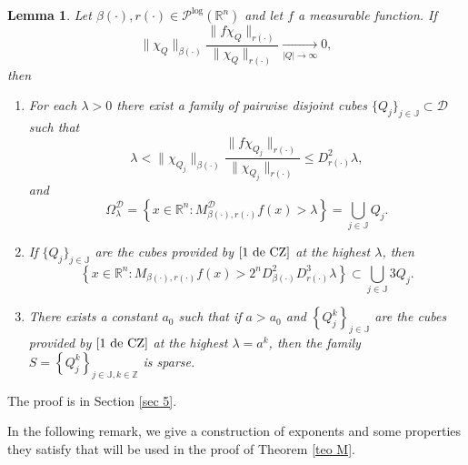\documentclass[a4paper,11pt,reqno]{amsart}
\theoremstyle{plain}
\numberwithin{equation}{section}
\newtheorem{lema}[teo]{Lemma}
\theoremstyle{definition}
\newcommand{\R}{{\mathbb{R}^n}}
\begin{document}
\begin{lema}\label{lema descomposición de C-Z}
	Let ${\beta(\cdot)},{r(\cdot)}\in\mathcal{P}^{\text{log}}(\R)$ and let $f$ a measurable function. If
	\begin{equation}\label{hipotesis de C-Z}
		\|\chi_Q\|_{\beta(\cdot)}\frac{\|f\chi_Q\|_{r(\cdot)}}{\|\chi_Q\|_{r(\cdot)}}\underset{|Q|\to\infty}{\longrightarrow}0,
	\end{equation}
	then
	\begin{enumerate}
		\item\label{1 de CZ} For each $\lambda>0$ there exist a family of pairwise disjoint cubes $\{Q_j\}_{j\in{\mathbb{J}}}\subset{\mathcal{D}}$  such that 
		\begin{equation*}
			\lambda<\|\chi_{Q_j}\|_{\beta(\cdot)}\frac{\|f\chi_{Q_j}\|_{r(\cdot)}}{\|\chi_{Q_j}\|_{r(\cdot)}}\leq D^2_{r(\cdot)}\lambda,
		\end{equation*}
		and
		\begin{equation*}
			\Omega^{\mathcal{D}}_\lambda=\left\{x\in\R : M^{\mathcal{D}}_{{\beta(\cdot)},{r(\cdot)}}f(x)>\lambda\right\}=\underset{j\in{\mathbb{J}}}{\bigcup}Q_j.
		\end{equation*}
		
		\item\label{2 de CZ} If $\{Q_j\}_{j\in{\mathbb{J}}}$ are the cubes provided by $\eqref{1 de CZ}$ at the highest $\lambda$, then
		\begin{equation*}
			\left\{x\in\R : M_{{\beta(\cdot)},{r(\cdot)}}f(x)>2^nD^2_{\beta(\cdot)} D^3_{r(\cdot)}\lambda\right\}\subset\underset{j\in{\mathbb{J}}}{\bigcup}3Q_j.
		\end{equation*}
		
		\item \label{3 de CZ} There exists a constant $a_0$ such that if $a>a_0$ and $\left\{Q_j^k\right\}_{j\in{\mathbb{J}}}$ are the cubes provided by $\eqref{1 de CZ}$ at the highest $\lambda=a^k$, then the family $S=\left\{Q_j^k\right\}_{j\in{\mathbb{J}},k\in\mathbb{Z}}$ is sparse.
	\end{enumerate}
\end{lema}
The proof is in Section \ref{sec 5}.

In the following remark, we give a construction of exponents and some properties they satisfy that will be used in the proof of Theorem \ref{teo M}.
	
\end{document}
